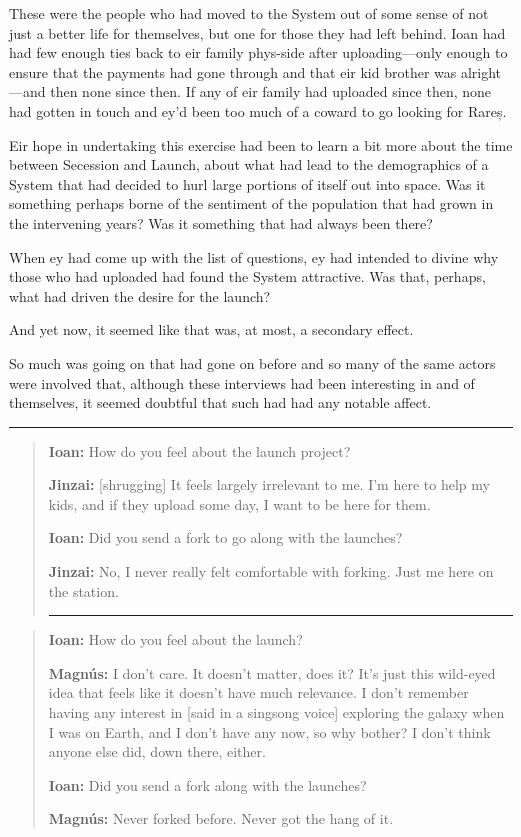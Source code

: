 These were the people who had moved to the System out of some sense of not just a better life for themselves, but one for those they had left behind. Ioan had had few enough ties back to eir family phys-side after uploading---only enough to ensure that the payments had gone through and that eir kid brother was alright---and then none since then. If any of eir family had uploaded since then, none had gotten in touch and ey'd been too much of a coward to go looking for Rareș.

Eir hope in undertaking this exercise had been to learn a bit more about the time between Secession and Launch, about what had lead to the demographics of a System that had decided to hurl large portions of itself out into space. Was it something perhaps borne of the sentiment of the population that had grown in the intervening years? Was it something that had always been there?

When ey had come up with the list of questions, ey had intended to divine why those who had uploaded had found the System attractive. Was that, perhaps, what had driven the desire for the launch?

And yet now, it seemed like that was, at most, a secondary effect.

So much was going on that had gone on before and so many of the same actors were involved that, although these interviews had been interesting in and of themselves, it seemed doubtful that such had had any notable affect.

\begin{center}\rule{0.5\linewidth}{0.5pt}\end{center}

\begin{quote}
\textbf{Ioan:} How do you feel about the launch project?

\textbf{Jinzai:} {[}shrugging{]} It feels largely irrelevant to me. I'm here to help my kids, and if they upload some day, I want to be here for them.

\textbf{Ioan:} Did you send a fork to go along with the launches?

\textbf{Jinzai:} No, I never really felt comfortable with forking. Just me here on the station.

\begin{center}\rule{0.5\linewidth}{0.5pt}\end{center}
\end{quote}

\begin{quote}
\textbf{Ioan:} How do you feel about the launch?

\textbf{Magnús:} I don't care. It doesn't matter, does it? It's just this wild-eyed idea that feels like it doesn't have much relevance. I don't remember having any interest in {[}said in a singsong voice{]} exploring the galaxy when I was on Earth, and I don't have any now, so why bother? I don't think anyone else did, down there, either.

\textbf{Ioan:} Did you send a fork along with the launches?

\textbf{Magnús:} Never forked before. Never got the hang of it.
\end{quote}

